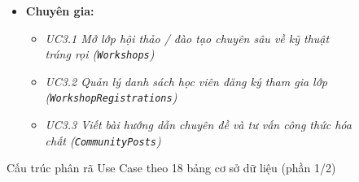 \begin{figure}[H]
\begin{tcolorbox}[colback=blue!5!white,colframe=blue!75!black,title=\textbf{BẢNG TỔNG HỢP CÁC USE CASE TƯƠNG ỨNG VỚI 18 BẢNG TRONG CƠ SỞ DỮ LIỆU}]
\begin{itemize}[leftmargin=1.5em]
\begin{itemize}
        \item \textit{UC2.3 Quản lý kho máy móc \& vật tư tiêu hao (\texttt{Equipment})}
        \item \textit{UC2.4 Ghi nhận lịch sử bảo trì, bảo dưỡng thiết bị (\texttt{EquipmentMaintenance})}
        \item \textit{UC2.5 Tạo các gói dịch vụ và cấu hình máy móc đi kèm trong gói (\texttt{ServicePackages, PackageEquipment})}
        \item \textit{UC2.6 Duyệt đơn, cập nhật trạng thái đơn đặt phòng (\texttt{Reservations, ReservationStatusHistory})}
        \item \textit{UC2.7 Điều hành phiên làm việc thực tế, ghi nhận phụ phí (\texttt{ServiceSessions})}
        \item \textit{UC2.8 Xem bảng điều khiển thống kê doanh thu, đánh giá từ khách (\texttt{Payments, Reviews})}
    \end{itemize}
    \item \textbf{Chuyên gia:}
    \begin{itemize}
        \item \textit{UC3.1 Mở lớp hội thảo / đào tạo chuyên sâu về kỹ thuật tráng rọi (\texttt{Workshops})}
        \item \textit{UC3.2 Quản lý danh sách học viên đăng ký tham gia lớp (\texttt{WorkshopRegistrations})}
        \item \textit{UC3.3 Viết bài hướng dẫn chuyên đề và tư vấn công thức hóa chất (\texttt{CommunityPosts})}
    \end{itemize}
\end{itemize}
\end{tcolorbox}
\caption{Cấu trúc phân rã Use Case theo 18 bảng cơ sở dữ liệu (phần 1/2)}
\end{figure}

\clearpage

